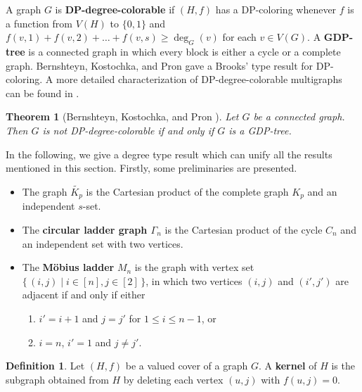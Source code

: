 \documentclass{article}
\newtheorem{theorem}{Theorem}[section]
\theoremstyle{definition}
\newtheorem{definition}{Definition}
\begin{document}
A graph $G$ is \textbf{DP-degree-colorable} if $(H, f)$ has a DP-coloring whenever $f$ is a function from $V(H)$ to $\{0, 1\}$ and $f(v, 1) + f(v, 2) + \dots + f(v, s) \geq \deg_{G}(v)$ for each $v \in V(G)$. A \textbf{GDP-tree} is a connected graph in which every block is either a cycle or a complete graph. Bernshteyn, Kostochka, and Pron \cite{MR3686937} gave a Brooks' type result for DP-coloring. A more detailed characterization of DP-degree-colorable multigraphs can be found in \cite{MR3948125}.  
\begin{theorem}[Bernshteyn, Kostochka, and Pron \cite{MR3686937}]\label{DL}
Let $G$ be a connected graph. Then $G$ is not DP-degree-colorable if and only if $G$ is a GDP-tree. 
\end{theorem}



In the following, we give a degree type result which can unify all the results mentioned in this section. Firstly, some preliminaries are presented. 
\begin{itemize}
\item The graph $\widetilde{K_{p}}$ is the Cartesian product of the complete graph $K_{p}$ and an independent $s$-set. 

\item The \textbf{circular ladder graph $\Gamma_{n}$} is the Cartesian product of the cycle $C_{n}$ and an independent set with two vertices. 

\item The \textbf{M\"{o}bius ladder} $M_{n}$ is the graph with vertex set $\big\{\,(i, j) \mid i \in [n], j \in [2]\,\big\}$, in which two vertices $(i, j)$ and $(i', j')$ are adjacent if and only if either
\begin{enumerate}[label = ---]
\item $i' = i + 1$ and $j = j'$ for $1 \leq i \leq n-1$, or 
\item $i = n$, $i'= 1$ and $j \neq j'$. 
\end{enumerate}
\end{itemize}

\begin{definition}
Let $(H, f)$ be a valued cover of a graph $G$. A \textbf{kernel} of $H$ is the subgraph obtained from $H$ by deleting each vertex $(u, j)$ with $f(u, j) = 0$. 
\end{definition}
\end{document}
